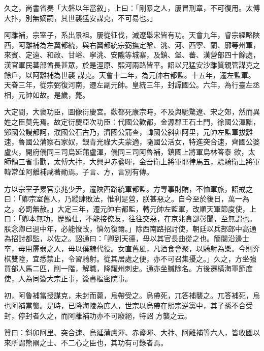 \begin{pinyinscope}
 久之，尚書省奏「大磐以年當敘」，上曰：「剛暴之人，屢冒刑章，不可復用。太傅大抃，別無嫡嗣，其世襲猛安謀克，不可易也。」



 阿離補，宗室子，系出景祖。屢從征伐，滅遼舉宋皆有功。天會九年，睿宗經略陜西，阿離補為左翼都統，與右翼都統宗弼撫定鞏、洮、河、西寧、蘭、廓等州軍，來賓、定遠、和政、甘峪、寧洮、安隴等城寨，及鎮、堡、蕃、漢營部四十餘處，漢官軍民蕃部酋長甚眾，於是涇原、熙河兩路皆平。詔以兄猛安沙離質親管謀克之餘戶，以阿離補為世襲
 謀克。天會十二年，為元帥右都監。十五年，遷左監軍。天眷三年，從宗弼復河南，遷左副元帥。皇統三年，封譚國公。六年，為行臺左丞相，元帥如故。是歲，薨。



 大定間，大褒功臣，圖像衍慶宮。歡都死康宗時，不及與馳騖遼、宋之郊，然而異姓之臣莫先焉。故定衍慶亞次功臣：代國公歡都，金源郡王石土門，徐國公渾黜，鄭國公謾都訶，濮國公石古乃，濟國公蒲查，韓國公斜卯阿里，元帥左監軍拔離速，魯國公蒲察石家奴，銀青光祿大夫蒙適，隨國公活女，特進突合速，齊國公婆盧火，開府儀同三司烏延蒲盧渾，儀同三司阿魯補，鎮國上將軍烏林答泰
 欲，太師領三省事勖，太傅大抃，大興尹赤盞暉，金吾衛上將軍耶律馬五，驃騎衛上將軍韓常並阿離補咸著勛焉。子言、方，言別有傳。



 方以宗室子累官京兆少尹，遷陜西路統軍都監。方專事財賄，不恤軍旅，詔戒之曰：「卿宗室舊人，乃縱肆敗法，惟利是營，朕甚惡之。自今至於後日，萬一為之，必罰無赦。」大定三年，遷元帥右都監，轉元帥左監軍，改順天軍節度使，上曰：「卿本無功，歷顯仕，不能接僚友，往往交惡，在京兆貪鄙彰聞，至無謂也。朕念卿已過中年，必能悛改，慎勿復爾。」除西南路招討使，朝廷以兵部郎中高通
 為招討都監，以佐之。詔通曰：「卿到天德，毋以其官長曲從之也。簡閱沿邊士卒，毋用孱弱之人，毋以僕隸代役。女直舊風，凡酒食會聚，以騎射為樂。今則弈棋雙陸，宜悉禁止，令習騎射。從其居處之便，亦不可召集擾之。」久之，方坐強買部人馬二匹，削一階，解職，降耀州刺史。通亦坐贓除名。方後遷橫海軍節度使，人為同簽大宗正事，簽書樞密院事。



 初，阿魯補當授謀克，未封而薨，烏帶受之。烏帶死，兀答補襲之。兀答補死，烏也阿補當襲。是時，已降海陵為庶人，世宗以烏帶在熙宗逆黨中，其子孫不合受封，停封者久之，而阿離補功亦不可廢絕，特詔
 方襲之云。



 贊曰：斜卯阿里、突合速、烏延蒲盧渾、赤盞暉、大抃、阿離補等六人，皆收國以來所謂熊羆之士、不二心之臣也，其功有可錄者焉。



\end{pinyinscope}